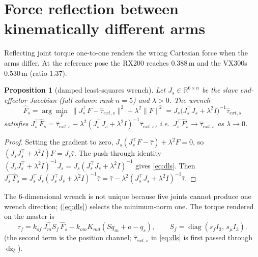 \documentclass[11pt,a4paper]{article}
\newtheorem{proposition}[theorem]{Proposition}
\theoremstyle{remark}
\theoremstyle{definition}
\newcommand{\diag}{\operatorname{diag}}
\newcommand{\dz}{\operatorname{dz}}
\newcommand{\Real}{\mathbb{R}}
\begin{document}
\section{Force reflection between kinematically different arms}\label{sec:map}
Reflecting joint torque one-to-one renders the wrong Cartesian force when the arms differ. At the reference pose the RX200 reaches $0.388$\,m
and the VX300s $0.530$\,m (ratio $1.37$).

\begin{proposition}[damped least-squares wrench]\label{prop:dls}
Let $J_s\in\Real^{6\times n}$ be the slave end-effector Jacobian (full column rank $n=5$) and $\lambda>0$. The wrench
\begin{equation}\label{eq:dls}
\hat F_s=\arg\min_F\ \|J_s^\top F-\hat\tau_{ext,s}\|^2+\lambda^2\|F\|^2=J_s\big(J_s^\top J_s+\lambda^2I\big)^{-1}\hat\tau_{ext,s}
\end{equation}
satisfies $J_s^\top\hat F_s=\hat\tau_{ext,s}-\lambda^2(J_s^\top J_s+\lambda^2I)^{-1}\hat\tau_{ext,s}$, i.e.\ $J_s^\top\hat F_s\to\hat\tau_{ext,s}$ as $\lambda\to0$.
\end{proposition}
\begin{proof}
Setting the gradient to zero, $J_s(J_s^\top F-\hat\tau)+\lambda^2F=0$, so $(J_sJ_s^\top+\lambda^2I)F=J_s\hat\tau$. The push-through identity
$(J_sJ_s^\top+\lambda^2I)^{-1}J_s=J_s(J_s^\top J_s+\lambda^2I)^{-1}$ gives \eqref{eq:dls}. Then $J_s^\top\hat F_s=J_s^\top J_s(J_s^\top J_s+\lambda^2I)^{-1}\hat\tau=
\hat\tau-\lambda^2(J_s^\top J_s+\lambda^2I)^{-1}\hat\tau$.
\end{proof}
The $6$-dimensional wrench is not unique because five joints cannot produce one wrench direction; (\ref{eq:dls}) selects the minimum-norm one.
The torque rendered on the master is
\begin{equation}\label{eq:force}
\tau_f=k_{of}\,J_m^\top S_f\,\hat F_s-k_{om}K_{md}(Sq_m+o-q_s),\qquad S_f=\diag(s_f I_3,\,s_\mu I_3).
\end{equation}
(the second term is the position channel; $\hat\tau_{ext,s}$ in \eqref{eq:dls} is first passed through $\dz_\delta$).
\end{document}
